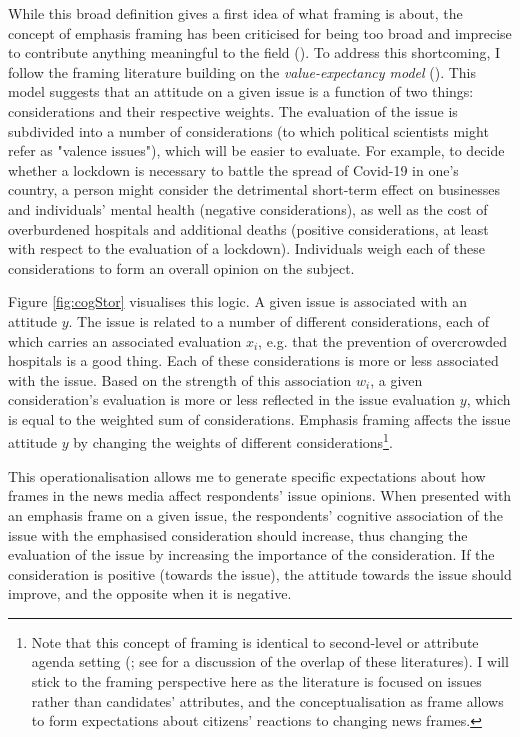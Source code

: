 \documentclass{article}
\begin{document}
While this broad definition gives a first idea of what framing is about, the concept of emphasis framing has been criticised for being too broad and imprecise to contribute anything meaningful to the field (\cite{Scheufele2012}). To address this shortcoming, I follow the framing literature building on the \textit{value-expectancy model} (\cite{Ajzen2000, Nelson1997}). This model suggests that an attitude on a given issue is a function of two things: considerations and their respective weights. The evaluation of the issue is subdivided into a number of considerations (to which political scientists might refer as "valence issues"), which will be easier to evaluate. For example, to decide whether a lockdown is necessary to battle the spread of Covid-19 in one's country, a person might consider the detrimental short-term effect on businesses and individuals' mental health (negative considerations), as well as the cost of overburdened hospitals and additional deaths (positive considerations, at least with respect to the evaluation of a lockdown). Individuals weigh each of these considerations to form an overall opinion on the subject. 


Figure \ref{fig:cogStor} visualises this logic. A given issue is associated with an attitude $y$. The issue is related to a number of different considerations, each of which carries an associated evaluation $x_i$, e.g. that the prevention of overcrowded hospitals is a good thing. Each of these considerations is more or less associated with the issue. Based on the strength of this association $w_i$, a given consideration's evaluation is more or less reflected in the issue evaluation $y$, which is equal to the weighted sum of considerations. Emphasis framing affects the issue attitude $y$ by changing the weights of different considerations\footnote{Note that this concept of framing is identical to second-level or attribute agenda setting (\cite{Lopezescobar2017, McCombs2000}; see \cite[174]{Mclaren2018} for a discussion of the overlap of these literatures). I will stick to the framing perspective here as the literature is focused on issues rather than candidates' attributes, and the conceptualisation as frame allows to form expectations about citizens' reactions to changing news frames.}.

This operationalisation allows me to generate specific expectations about how frames in the news media affect respondents' issue opinions. When presented with an emphasis frame on a given issue, the respondents' cognitive association of the issue with the emphasised consideration should increase, thus changing the evaluation of the issue by increasing the importance of the consideration. If the consideration is positive (towards the issue), the attitude towards the issue should improve, and the opposite when it is negative. \medskip
\end{document}
